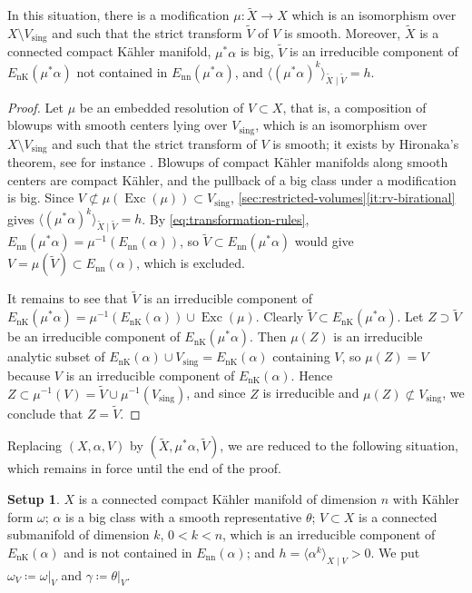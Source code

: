 \documentclass[11pt,a4paper]{amsart}
\newcommand{\EnK}{E_{\mathrm{nK}}}
\newcommand{\Enn}{E_{\mathrm{nn}}}
\DeclareMathOperator{\Exc}{Exc}
\theoremstyle{definition}
\newtheorem{setup}[theorem]{Setup}
\begin{document}
\begin{lemma}\label{lem:resolution}
In this situation, there is a modification
$\mu\colon\widetilde X\to X$ which is an isomorphism over
$X\setminus V_{\mathrm{sing}}$ and such that the strict transform
$\widetilde V$ of $V$ is smooth. Moreover, $\widetilde X$ is a connected
compact K\"ahler manifold, $\mu^*\alpha$ is big, $\widetilde V$ is an
irreducible component of $\EnK(\mu^*\alpha)$ not contained in
$\Enn(\mu^*\alpha)$, and
$\langle(\mu^*\alpha)^k\rangle_{\widetilde X\mid\widetilde V}=h$.
\end{lemma}

\begin{proof}
Let $\mu$ be an embedded resolution of $V\subset X$, that is, a
composition of blowups with smooth centers lying over $V_{\mathrm{sing}}$,
which is an isomorphism over $X\setminus V_{\mathrm{sing}}$ and such that
the strict transform of $V$ is smooth; it exists by Hironaka's theorem,
see for instance \cite{BM97}. Blowups of compact K\"ahler manifolds along
smooth centers are compact K\"ahler, and the pullback of a big class under
a modification is big. Since $V\not\subset\mu(\Exc(\mu))\subset
V_{\mathrm{sing}}$, \cref{sec:restricted-volumes}\ref{it:rv-birational}
gives $\langle(\mu^*\alpha)^k\rangle_{\widetilde X\mid\widetilde V}=h$. By
\eqref{eq:transformation-rules}, $\Enn(\mu^*\alpha)=\mu^{-1}(\Enn(\alpha))$,
so $\widetilde V\subset\Enn(\mu^*\alpha)$ would give
$V=\mu(\widetilde V)\subset\Enn(\alpha)$, which is excluded.

It remains to see that $\widetilde V$ is an irreducible component of
$\EnK(\mu^*\alpha)=\mu^{-1}(\EnK(\alpha))\cup\Exc(\mu)$. Clearly
$\widetilde V\subset\EnK(\mu^*\alpha)$. Let $Z\supset\widetilde V$ be an
irreducible component of $\EnK(\mu^*\alpha)$. Then $\mu(Z)$ is an
irreducible analytic subset of
$\EnK(\alpha)\cup V_{\mathrm{sing}}=\EnK(\alpha)$ containing $V$, so
$\mu(Z)=V$ because $V$ is an irreducible component of $\EnK(\alpha)$.
Hence $Z\subset\mu^{-1}(V)=\widetilde V\cup\mu^{-1}(V_{\mathrm{sing}})$,
and since $Z$ is irreducible and $\mu(Z)\not\subset V_{\mathrm{sing}}$, we
conclude that $Z=\widetilde V$.
\end{proof}

Replacing $(X,\alpha,V)$ by $(\widetilde X,\mu^*\alpha,\widetilde V)$,
we are reduced to the following situation, which remains in force until
the end of the proof.

\begin{setup}\label{setup}
$X$ is a connected compact K\"ahler manifold of dimension $n$ with
K\"ahler form $\omega$; $\alpha$ is a big class with a smooth
representative $\theta$; $V\subset X$ is a connected submanifold of
dimension $k$, $0<k<n$, which is an irreducible component of
$\EnK(\alpha)$ and is not contained in $\Enn(\alpha)$; and
$h=\langle\alpha^k\rangle_{X\mid V}>0$. We put $\omega_V\coloneqq \omega|_V$
and $\gamma\coloneqq \theta|_V$.
\end{setup}
\end{document}
